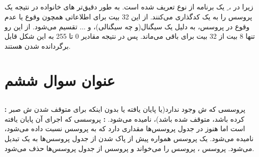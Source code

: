 \documentclass{article}
\begin{document}
\subsection{}
\lr{}
\subsection{}
زیرا در ، ِ یک برنامه از نوع  تعریف شده است. به طور دقیق‌تر های خانواده  در  نتیجه یک پروسس را به یک  کدگذاری می‌کنند. از این 32 بیت برای اطلاعاتی همچون وقوع یا عدم وقوع  در پروسس،  به دلیل یک سیگنال(و چه سیگنالی)، و $\ldots$ تقسیم می‌شود. از این رو تنها 8 بیت از 32 بیت برای  باقی می‌ماند. پس در نتیجه مقادیر 0 تا 255 به این شکل قابل برگردانده شدن هستند.

\subsection{}


\section{عنوان سوال ششم}
\subsection{}
\textbf{:}
پروسسی که ش وجود ندارد(یا پایان یافته یا بدون اینکه برای متوقف شدن ش صبر کرده باشد، متوقف شده باشد)،  نامیده می‌شود.
\newline
\textbf{:}
پروسسی که اجرای آن پایان یافته است اما هنوز در جدول پروسس‌ها مقداری دارد که به پروسس  نسبت داده می‌شود،  نامیده می‌شود. یک پروسس  همواره پیش از پاک شدن از جدول پروسس‌ها به یک  تبدیل می‌شود. پروسس ،  پروسس  را می‌خواند و پروسس  از جدول پروسس‌ها حذف می‌شود.
\end{document}
